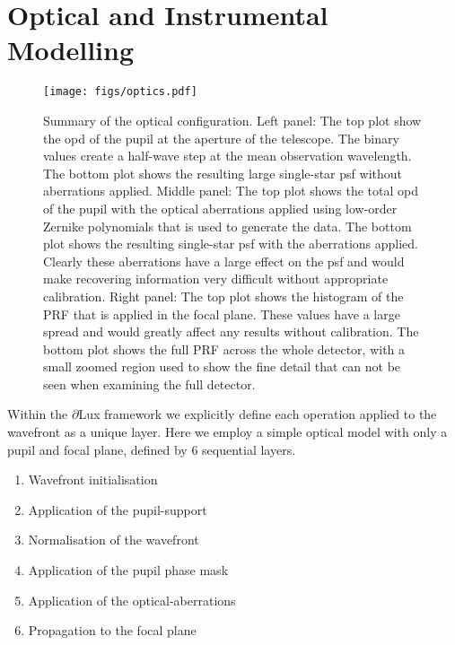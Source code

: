 \documentclass[twocolumn]{spie}
\newcommand\jax{\textsc{Jax}\xspace}
\newcommand\dlux{$\partial$Lux\xspace}
\begin{document}




\section{Optical and Instrumental Modelling}
\label{sec:simulation}

\begin{figure*}
    \centering
    \texttt{[image: figs/optics.pdf]}
    \caption{Summary of the optical configuration. Left panel: The top plot show the \ac{opd} of the pupil at the aperture of the telescope. The binary values create a half-wave step at the mean observation wavelength. The bottom plot shows the resulting large single-star \ac{psf} without aberrations applied. Middle panel: The top plot shows the total \ac{opd} of the pupil with the optical aberrations applied using low-order Zernike polynomials that is used to generate the data. The bottom plot shows the resulting single-star \ac{psf} with the aberrations applied. Clearly these aberrations have a large effect on the \ac{psf} and would make recovering information very difficult without appropriate calibration. Right panel: The top plot shows the histogram of the PRF that is applied in the focal plane. These values have a large spread and would greatly affect any results without calibration. The bottom plot shows the full PRF across the whole detector, with a small zoomed region used to show the fine detail that can not be seen when examining the full detector.}
    \label{fig:optics}
\end{figure*}


Within the $\partial$Lux framework we explicitly define each operation applied to the wavefront as a unique layer. Here we employ a simple optical model with only a pupil and focal plane, defined by 6 sequential layers.

\begin{enumerate}
    \item Wavefront initialisation
    \item Application of the pupil-support
    \item Normalisation of the wavefront
    \item Application of the pupil phase mask
    \item Application of the optical-aberrations
    \item Propagation to the focal plane
\end{enumerate}
\end{document}
